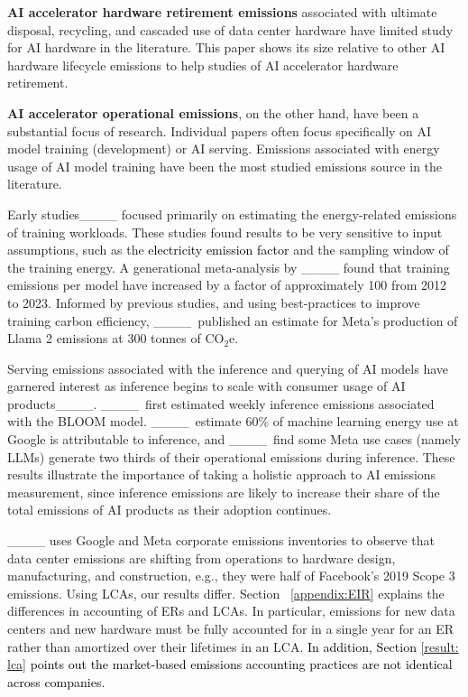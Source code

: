 \textbf{AI accelerator hardware retirement emissions} associated with ultimate disposal, recycling, and cascaded use of data center hardware have limited study for AI hardware in the literature. This paper shows its size relative to other AI hardware lifecycle emissions to help studies of AI accelerator hardware retirement.

\textbf{AI accelerator operational emissions}, on the other hand,  have been a substantial focus of research. Individual papers often focus specifically on AI model training (development) or AI serving. Emissions associated with energy usage of AI model training have been the most studied emissions source in the literature. 

Early studies____ focused primarily on estimating the energy-related emissions of training workloads. These studies found results to be very sensitive to input assumptions, such as the \textcolor{black}{electricity emission factor} and the sampling window of the training energy. A generational meta-analysis by ____ found that training emissions per model have increased by a factor of approximately 100 from 2012 to 2023. Informed by previous studies, and using best-practices to improve training carbon efficiency, ____~published an estimate for Meta’s production of Llama 2 emissions at 300 tonnes of CO$_{2}$e. 

Serving emissions associated with the inference and querying of AI models have garnered interest as inference begins to scale with consumer usage of AI products____. ____~first estimated weekly inference emissions associated with the BLOOM model. ____~estimate 60\% of machine learning energy use at Google is attributable to inference, and ____~find some Meta use cases (namely LLMs) generate two thirds of their operational emissions during inference. These results illustrate the importance of taking a holistic approach to AI emissions measurement, since inference emissions are likely to increase their share of the total emissions of AI products as their adoption continues. 

____ uses Google and Meta corporate emissions inventories to observe that data center emissions are shifting from operations to hardware design, manufacturing, and construction, e.g., they were half of Facebook’s 2019 Scope 3 emissions. Using LCAs, our results differ. Section ~\ref{appendix:EIR} explains the differences in accounting of ERs and LCAs. In particular, emissions for new data centers and new hardware must be fully accounted for in a single year for an ER rather than amortized over their lifetimes in an LCA.  \textcolor{black}{In addition, Section \ref{result: lca} points out the market-based emissions accounting practices are not identical across companies.}

